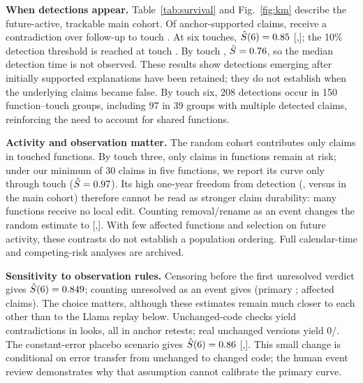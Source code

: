 


\textbf{When detections appear.} Table~\ref{tab:survival} and Fig.~\ref{fig:km} describe the future-active, trackable main cohort. Of \XMainN{} anchor-supported claims, \XMainDeaths{} receive a contradiction over follow-up to touch \XKMax{}. At six touches, $\hat S(6)=0.85$ [\XMainSKLo,\XMainSKHi]; the 10\% detection threshold is reached at touch \XMainTNineZero{}. By touch \XKMax{}, $\hat S=0.76$, so the median detection time is not observed. These results show detections emerging after initially supported explanations have been retained; they do not establish when the underlying claims became false. By touch six, 208 detections occur in 150 function--touch groups, including 97 in 39 groups with multiple detected claims, reinforcing the need to account for shared functions.

\textbf{Activity and observation matter.} The random cohort contributes only \XRandomAtRiskOne{} claims in \XRandomFuncsAtRiskOne{} touched functions. By touch three, only \XRandomAtRiskThree{} claims in \XRandomFuncsAtRiskThree{} functions remain at risk; under our minimum of 30 claims in five functions, we report its curve only through touch \XRandomKReliable{} ($\hat S=0.97$). Its high one-year freedom from detection (\XRandomSThreeSixFived{}, versus \XMainSThreeSixFived{} in the main cohort) therefore cannot be read as stronger claim durability: many functions receive no local edit. Counting removal/rename as an event changes the random estimate to \XRandomSThreeSixFivedRmdeath{} [\XRandomSThreeSixFivedRmdeathLo,\XRandomSThreeSixFivedRmdeathHi]. With few affected functions and selection on future activity, these contrasts do not establish a population ordering. Full calendar-time and competing-risk analyses are archived.

\textbf{Sensitivity to observation rules.} Censoring before the first unresolved verdict gives $\hat S(6)=0.849$; counting unresolved as an event gives \XUnresolvedEventS{} (primary \XMainSK{}; \XUnresolvedClaims{} affected claims). The choice matters, although these estimates remain much closer to each other than to the Llama replay below. Unchanged-code checks yield \XPlaceboNCon{} contradictions in \XPlaceboNLooks{} looks, all in anchor retests; real unchanged versions yield 0/\XPlaceboVersionsN{}. The constant-error placebo scenario gives $\hat S(6)=0.86$ [\XMainSKCorrectedLo,\XMainSKCorrectedHi]. This small change is conditional on error transfer from unchanged to changed code; the human event review demonstrates why that assumption cannot calibrate the primary curve.

